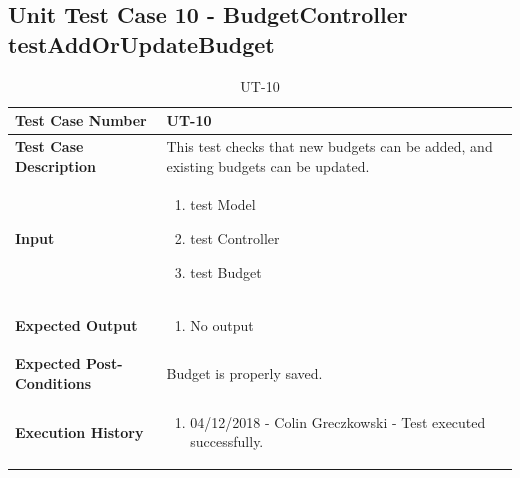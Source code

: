 \documentclass[12pt]{article}
\begin{document}
\subsection{Unit Test Case 10 - BudgetController testAddOrUpdateBudget}
\def\arraystretch{1.5}%
\begin{table}[htbp]
\centering
\caption{UT-10}
\label{UT-10}
\begin{tabularx}{\textwidth}{ | l | X |}
\hline
\textbf{Test Case Number}      		&  UT-10                 			\\ \hline
\textbf{Test Case Description}    	&  This test checks that new budgets can be added, and existing budgets can be updated.                				\\ \hline
\textbf{Input}         			& 	\begin{enumerate}
								\item test Model
								\item test Controller
								\item test Budget
							\end{enumerate} 		\\ \hline
\textbf{Expected Output}     		& 	\begin{enumerate}
								\item No output 
							\end{enumerate} 		\\ \hline
\textbf{Expected Post-Conditions}	& Budget is properly saved.                				\\ \hline
\textbf{Execution History}   		&  	\begin{enumerate}
								\item 04/12/2018 - Colin Greczkowski - Test executed successfully.
							\end {enumerate} \\ \hline
\end{tabularx}
\end{table}
\clearpage
\end{document}
